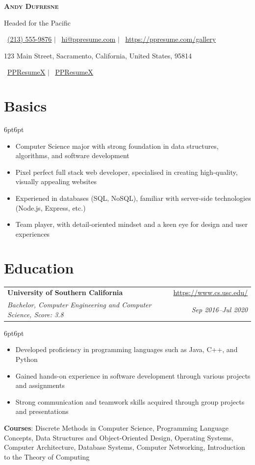 \documentclass[a4paper,10pt]{article}
\makeatletter
\let\oldhref\href
\renewcommand{\href}[2]{\oldhref{#1}{\underline{#2}}}%
\newcommand{\resumeSubheading}[4]{
  \begin{tabular*}{\textwidth}[t]{l@{\extracolsep{\fill}}r}
    \textbf{#1} & #2 \\
    \textit{#3} & \textit{#4} \\
  \end{tabular*}
}
\makeatother
\begin{document}
\begin{center}
\textbf{\Huge \scshape Andy Dufresne}\vspace{2pt}

{\Large Headed for the Pacific}

{\small \faPhoneVolume}~\href{tel:(213) 555-9876}{(213) 555-9876} $|$ {\small \faEnvelope[regular]}~\href{mailto:hi@ppresume.com}{hi@ppresume.com} $|$ {\small \faGlobe}~\url{https://ppresume.com/gallery}

123 Main Street, Sacramento, California, United States, 95814

{\small \faLine}\ \href{https://line.com/PPResumeX}{PPResumeX} $|$ {\small \faTwitter}\ \href{https://twitter.com/PPResumeX}{PPResumeX}
\end{center}

\section{Basics}

\begin{adjustwidth}{6pt}{6pt}
\begin{itemize}
\item Computer Science major with strong foundation in data structures, algorithms, and software development
\item Pixel perfect full stack web developer, specialised in creating high-quality, visually appealing websites
\item Experiened in databases (SQL, NoSQL), familiar with server-side technologies (Node.js, Express, etc.)
\item Team player, with detail-oriented mindset and a keen eye for design and user experiences
\end{itemize}
\end{adjustwidth}
\section{Education}
\resumeSubheading
{University of Southern California}{\url{https://www.cs.usc.edu/}}
{Bachelor, Computer Engineering and Computer Science, Score: 3.8}{Sep 2016–Jul 2020}
\begin{adjustwidth}{6pt}{6pt}
\begin{itemize}
\item Developed proficiency in programming languages such as Java, C++, and Python
\item Gained hands-on experience in software development through various projects and assignments
\item Strong communication and teamwork skills acquired through group projects and presentations
\end{itemize}
\textbf{Courses}: Discrete Methods in Computer Science, Programming Language Concepts, Data Structures and Object-Oriented Design, Operating Systems, Computer Architecture, Database Systems, Computer Networking, Introduction to the Theory of Computing
\end{adjustwidth}
\end{document}
